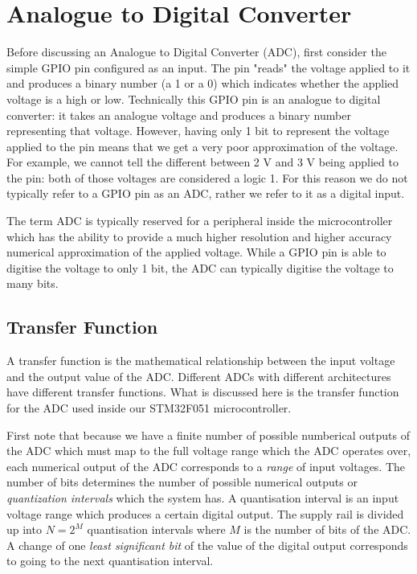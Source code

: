 \chapter{Analogue to Digital Converter}

Before discussing an Analogue to Digital Converter (ADC), first consider the simple GPIO pin configured as an input. 
The pin "reads" the voltage applied to it and produces a binary number (a 1 or a 0) which indicates whether the applied voltage is a high or low. Technically this GPIO pin is an analogue to digital converter: it takes an analogue voltage and produces a binary number representing that voltage. 
However, having only 1 bit to represent the voltage applied to the pin means that we get a very poor approximation of the voltage. 
For example, we cannot tell the different between 2 V and 3 V being applied to the pin: both of those voltages are considered a logic 1. 
For this reason we do not typically refer to a GPIO pin as an ADC, rather we refer to it as a digital input.

The term ADC is typically reserved for a peripheral inside the microcontroller which has the ability to provide a much higher resolution and higher accuracy numerical approximation of the applied voltage. 
While a GPIO pin is able to digitise the voltage to only 1 bit, the ADC can typically digitise the voltage to many bits. 

\section{Transfer Function}
A transfer function is the mathematical relationship between the input voltage and the output value of the ADC.
Different ADCs with different architectures have different transfer functions. What is discussed here is the transfer function for the ADC used inside our STM32F051 microcontroller. 

First note that because we have a finite number of possible numberical outputs of the ADC which must map to the full voltage range which the ADC operates over, each numerical output of the ADC corresponds to a \emph{range} of input voltages. 
The number of bits determines the number of possible numerical outputs or \emph{quantization intervals} which the system has. A quantisation interval is an input voltage range which produces a certain digital output. The supply rail is divided up into \(N = 2^M\) quantisation intervals where \(M\) is the number of bits of the ADC. 
A change of one \emph{least significant bit} of the value of the digital output corresponds to going to the next quantisation interval. 

